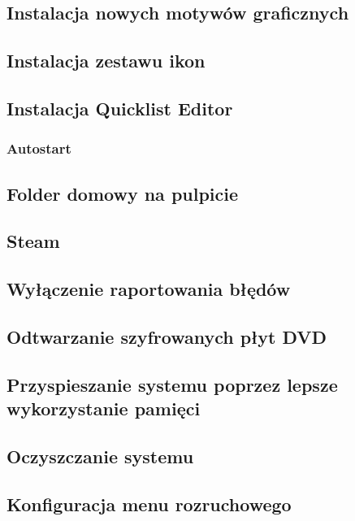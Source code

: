 \documentclass[a4paper,11pt,oneside]{mwart}
\begin{document}
		\subsection{Instalacja nowych motywów graficznych}
			
		\subsection{Instalacja zestawu ikon}
			
		\subsection{Instalacja Quicklist Editor}
			
		\subsubsection{Autostart}
			
		\subsection{Folder domowy na pulpicie}
			
		\subsection{Steam}
			
		\subsection{Wyłączenie raportowania błędów}
			
		\subsection{Odtwarzanie szyfrowanych płyt DVD}
			
		\subsection{Przyspieszanie systemu poprzez lepsze wykorzystanie pamięci}
			
		\subsection{Oczyszczanie systemu}
			
		\subsection{Konfiguracja menu rozruchowego}
			
\end{document}
